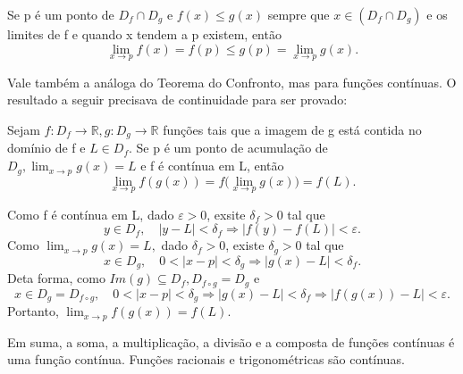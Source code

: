 \documentclass[Analysis/analysis_notes.tex]{subfiles}
\begin{document}
\begin{theorem*}
	Se p \'e um ponto de $D_{f}\cap D_{g}$ e $f(x)\leq{g(x)}$ sempre que $x\in{(D_{f}\cap D_{g})}$ e os limites de f e
	quando x tendem a p existem, ent\~ao
	$$
		\lim_{x\to p}f(x) = f(p)\leq{g(p)} = \lim_{x\to p}g(x).
	$$
\end{theorem*}
Vale tamb\'em a an\'aloga do Teorema do Confronto, mas para fun\c c\~oes cont\'inuas. O resultado a seguir precisava
de continuidade para ser provado:
\begin{theorem*}
	Sejam $f:D_{f}\rightarrow \mathbb{R}, g:D_{g}\rightarrow \mathbb{R}$ fun\c c\~oes tais que a imagem de g est\'a contida
	no dom\'inio de f e $L\in D_{f}.$ Se p \'e um ponto de acumula\c c\~ao de $D_{g}, \lim_{x\to p}g(x) = L$ e f \'e cont\'inua
	em L, ent\~ao
	$$
		\lim_{x\to p}f(g(x)) = f\biggl(\lim_{x\to p}g(x)\biggr) = f(L).
	$$
\end{theorem*}
\begin{proof*}
	Como f \'e cont\'inua em L, dado $\varepsilon > 0$, exsite $\delta_{f}>0$ tal que
	$$
		y\in D_{f},\quad |y-L|<\delta_{f} \Rightarrow |f(y)-f(L)|<\varepsilon.
	$$
	Como $\lim_{x\to p}g(x) = L,$ dado $\delta_{f}>0$, existe $\delta_{g}>0$ tal que
	$$
		x\in D_{g},\quad 0 <|x-p|<\delta_{g} \Rightarrow |g(x)-L|<\delta_{f}.
	$$
	Deta forma, como $Im(g)\subseteq{D_{f}}, D_{f\circ{g}}=D_{g}$ e
	$$
		x\in D_{g}=D_{f\circ{g}}, \quad 0<|x-p|<\delta_{g}\Rightarrow|g(x)-L|<\delta_{f}\Rightarrow|f(g(x))-L|<\varepsilon.
	$$
	Portanto, $\lim_{x\to p}f(g(x))=f(L).$ \qedsymbol
\end{proof*}
Em suma, a soma, a multiplica\c c\~ao, a divis\~ao e a composta de fun\c c\~oes cont\'inuas \'e uma fun\c c\~ao cont\'inua. Fun\c c\~oes
racionais e trigonom\'etricas s\~ao cont\'inuas.
\end{document}
